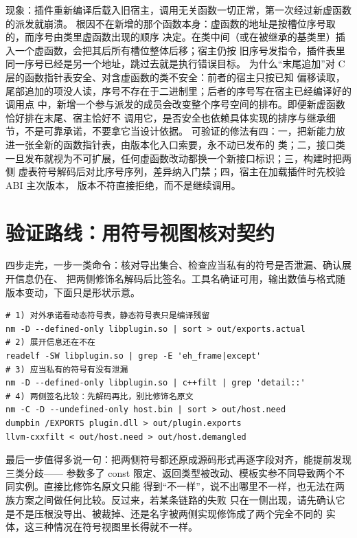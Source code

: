 \documentclass[12pt,a4paper,fontset=fandol]{ctexbook}
\newcommand{\Lang}[1]{\textsf{#1}}
\newcommand{\CL}{\Lang{C}}
\begin{document}
\begin{abibox}[title={插件末尾加了一个虚函数，旧宿主崩在派发上}]
现象：插件重新编译后载入旧宿主，调用无关函数一切正常，第一次经过新虚函数的派发就崩溃。
根因不在新增的那个函数本身：虚函数的地址是按槽位序号取的，而序号由类里虚函数出现的顺序
决定。在类中间（或在被继承的基类里）插入一个虚函数，会把其后所有槽位整体后移；宿主仍按
旧序号发指令，插件表里同一序号已经是另一个地址，跳过去就是执行错误目标。
为什么“末尾追加”对 \CL{} 层的函数指针表安全、对含虚函数的类不安全：前者的宿主只按已知
偏移读取，尾部追加的项没人读，序号不存在于二进制里；后者的序号写在宿主已经编译好的调用点
中，新增一个参与派发的成员会改变整个序号空间的排布。即便新虚函数恰好排在末尾、宿主恰好不
调用它，是否安全也依赖具体实现的排序与继承细节，不是可靠承诺，不要拿它当设计依据。
可验证的修法有四：一，把新能力放进一张全新的函数指针表，由版本化入口索要，永不动已发布的
类；二，接口类一旦发布就视为不可扩展，任何虚函数改动都换一个新接口标识；三，构建时把两侧
虚表符号解码后对比序号序列，差异纳入门禁；四，宿主在加载插件时先校验 ABI 主次版本，
版本不符直接拒绝，而不是继续调用。
\end{abibox}

\section{验证路线：用符号视图核对契约}\label{sec:cl13-verify}

四步走完，一步一类命令：核对导出集合、检查应当私有的符号是否泄漏、确认展开信息仍在、
把两侧修饰名解码后比签名。工具名确证可用，输出数值与格式随版本变动，下面只是形状示意。

\begin{lstlisting}[style=shellstyle, caption={符号视图核对（示意）}]
# 1) 对外承诺看动态符号表，静态符号表只是编译残留
nm -D --defined-only libplugin.so | sort > out/exports.actual
# 2) 展开信息还在不在
readelf -SW libplugin.so | grep -E 'eh_frame|except'
# 3) 应当私有的符号有没有泄漏
nm -D --defined-only libplugin.so | c++filt | grep 'detail::'
# 4) 两侧签名比较：先解码再比，别比修饰名原文
nm -C -D --undefined-only host.bin | sort > out/host.need
dumpbin /EXPORTS plugin.dll > out/plugin.exports
llvm-cxxfilt < out/host.need > out/host.demangled
\end{lstlisting}

最后一步值得多说一句：把两侧符号都还原成源码形式再逐字段对齐，能提前发现三类分歧——
参数多了 const 限定、返回类型被改动、模板实参不同导致两个不同实例。直接比修饰名原文只能
得到“不一样”，说不出哪里不一样，也无法在两族方案之间做任何比较。反过来，若某条链路的失败
只在一侧出现，请先确认它是不是压根没导出、被裁掉、还是名字被两侧实现修饰成了两个完全不同的
实体，这三种情况在符号视图里长得就不一样。
\end{document}
